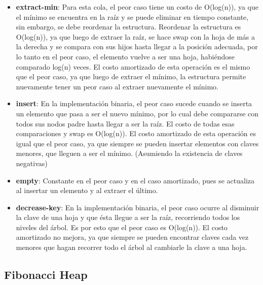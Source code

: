 \documentclass[11pt]{article}
\begin{document}
\begin{itemize}
    \item \textbf{extract-min}: Para esta cola, el peor caso tiene un costo de O(log(n)), ya que el mínimo se encuentra en la raíz y se puede eliminar en tiempo constante, sin embargo, se debe reordenar la estructura. Reordenar la estructura es O(log(n)), ya que luego de extraer la raíz, se hace swap con la hoja de más a la derecha y se compara con sus hijos hasta llegar a la posición adecuada, por lo tanto en el peor caso, el elemento vuelve a ser una hoja, habiéndose comparado log(n) veces. El costo amortizado de esta operación es el mismo que el peor caso, ya que luego de extraer el mínimo, la estructura permite nuevamente tener un peor caso al extraer nuevamente el mínimo.
    \item \textbf{insert}: En la implementación binaria, el peor caso sucede cuando se inserta un elemento que pasa a ser el nuevo mínimo, por lo cual debe compararse con todos sus nodos padre hasta llegar a ser la raíz. El costo de todas esas comparaciones y swap es O(log(n)). El costo amortizado de esta operación es igual que el peor caso, ya que siempre se pueden insertar elementos con claves menores, que lleguen a ser el mínimo. (Asumiendo la existencia de claves negativas)
    \item \textbf{empty}: Constante en el peor caso y en el caso amortizado, pues se actualiza al insertar un elemento y al extraer el último.
    \item \textbf{decrease-key}: En la implementación binaria, el peor caso ocurre al disminuir la clave de una hoja y que ésta llegue a ser la raíz, recorriendo todos los niveles del árbol. Es por esto que el peor caso es O(log(n)). El costo amortizado no mejora, ya que siempre se pueden encontrar claves cada vez menores que hagan recorrer todo el árbol al cambiarle la clave a una hoja.
\end{itemize}

\subsection{Fibonacci Heap}
\end{document}
